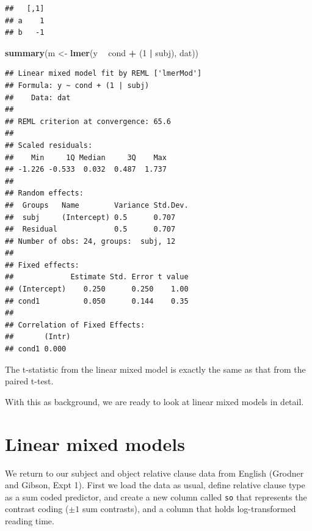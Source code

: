 \documentclass[12pt,]{krantz}
\newenvironment{Shaded}{\begin{snugshade}}{\end{snugshade}}
\newcommand{\DataTypeTok}[1]{\textcolor[rgb]{0.13,0.29,0.53}{#1}}
\newcommand{\DecValTok}[1]{\textcolor[rgb]{0.00,0.00,0.81}{#1}}
\newcommand{\KeywordTok}[1]{\textcolor[rgb]{0.13,0.29,0.53}{\textbf{#1}}}
\newcommand{\NormalTok}[1]{#1}
\newcommand{\OperatorTok}[1]{\textcolor[rgb]{0.81,0.36,0.00}{\textbf{#1}}}
\newcommand{\OtherTok}[1]{\textcolor[rgb]{0.56,0.35,0.01}{#1}}
\newcommand{\StringTok}[1]{\textcolor[rgb]{0.31,0.60,0.02}{#1}}
\begin{document}
\begin{verbatim}
##   [,1]
## a    1
## b   -1
\end{verbatim}

\begin{Shaded}
\begin{Highlighting}[]
\KeywordTok{summary}\NormalTok{(m <-}\StringTok{ }\KeywordTok{lmer}\NormalTok{(y }\OperatorTok{~}\StringTok{ }\NormalTok{cond }\OperatorTok{+}\StringTok{ }\NormalTok{(}\DecValTok{1} \OperatorTok{|}\StringTok{ }\NormalTok{subj), dat))}
\end{Highlighting}
\end{Shaded}

\begin{verbatim}
## Linear mixed model fit by REML ['lmerMod']
## Formula: y ~ cond + (1 | subj)
##    Data: dat
## 
## REML criterion at convergence: 65.6
## 
## Scaled residuals: 
##    Min     1Q Median     3Q    Max 
## -1.226 -0.533  0.032  0.487  1.737 
## 
## Random effects:
##  Groups   Name        Variance Std.Dev.
##  subj     (Intercept) 0.5      0.707   
##  Residual             0.5      0.707   
## Number of obs: 24, groups:  subj, 12
## 
## Fixed effects:
##             Estimate Std. Error t value
## (Intercept)    0.250      0.250    1.00
## cond1          0.050      0.144    0.35
## 
## Correlation of Fixed Effects:
##       (Intr)
## cond1 0.000
\end{verbatim}

The t-statistic from the linear mixed model is exactly the same as that from the paired t-test.

With this as background, we are ready to look at linear mixed models in detail.

\hypertarget{linear-mixed-models}{%
\section{Linear mixed models}\label{linear-mixed-models}}

We return to our subject and object relative clause data from English (Grodner and Gibson, Expt 1). First we load the data as usual, define relative clause type as a sum coded predictor, and create a new column called \texttt{so} that represents the contrast coding (\(\pm 1\) sum contrasts), and a column that holds log-transformed reading time.

\begin{Shaded}
\end{Shaded}
\end{document}
